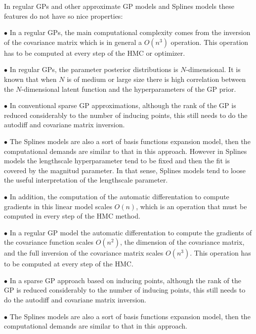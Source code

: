 \documentclass[]{interact}
\theoremstyle{plain}%
\theoremstyle{definition}
\theoremstyle{remark}
\begin{document}
In regular GPs and other approximate GP models and Splines models these features do not have so nice properties:

\vspace{2mm}
$\bullet$ In a regular GPs, the main computational complexity comes from the inversion of the covariance matrix which is in general a $O(n^3)$ operation. This operation has to be computed at every step of the HMC or optimizer.

\vspace{2mm}
$\bullet$ In regular GPs, the parameter posterior distributions is $N$-dimensional. It is known that when $N$ is of medium or large size there is high correlation between the $N$-dimensional latent function and the hyperparameters of the GP prior.

\vspace{2mm}
$\bullet$ In conventional sparse GP approximations, although the rank of the GP is reduced considerably to the number of inducing points, this still needs to do the autodiff and covariane matrix inversion.

\vspace{2mm}
$\bullet$ The Splines models are also a sort of basis functions expansion model, then the computational demands are similar to that in this approach. However in Splines models the lengthscale hyperparameter tend to be fixed and then the fit is covered by the magnitud parameter. In that sense, Splines models tend to loose the useful interpretation of the lengthscale parameter.

\vspace{2mm}
$\bullet$ In addition, the computation of the automatic differentation to compute gradients in this linear model scales $O(n)$, which is an operation that must be computed in every step of the HMC method.

\vspace{2mm}
$\bullet$ In a regular GP model the automatic differentation to compute the gradients of the covariance function scales $O(n^2)$, the dimension of the covariance matrix, and the full inversion of the covariance matrix scales $O(n^3)$. This operation has to be computed at every step of the HMC.

\vspace{2mm}
$\bullet$ In a sparse GP approach based on inducing points, although the rank of the GP is reduced considerably to the number of inducing points, this still needs to do the autodiff and covariane matrix inversion.

\vspace{2mm}
$\bullet$ The Splines models are also a sort of basis functions expansion model, then the computational demands are similar to that in this approach.
\end{document}
